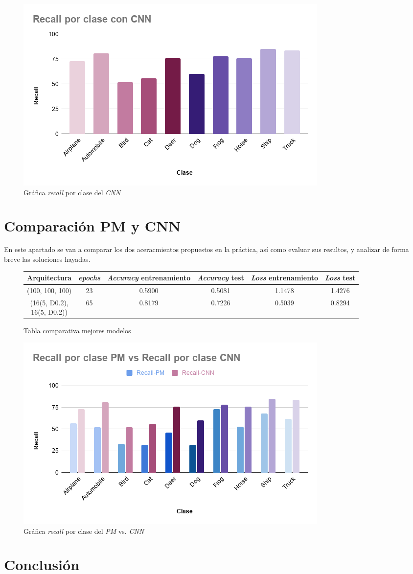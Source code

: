 \documentclass{uc3mpracticas}
\begin{document}
\begin{figure}[!h]
\centering
  \includegraphics[width=.65\linewidth]{Images/recall_clase_CNN.png}
  \caption*{Gráfica \textit{recall} por clase del \textit{CNN}}
\end{figure}




\section{Comparación PM y CNN}

En este apartado se van a comparar los dos aceracmientos propuestos en la práctica, así como evaluar sus resultos, y analizar de forma breve las soluciones hayadas.


\begin{figure}[!h]
\begin{center}
  \begin{tabular}{|c|c|c|c|c|c|}
    \hline
    \rowcolor{Gray}
        \textbf{Arquitectura} & \textbf{\textit{epochs}}& \textbf{\textit{Accuracy} entrenamiento} & \textbf{\textit{Accuracy} test} & \textbf{\textit{Loss} entrenamiento} & \textbf{\textit{Loss} test}\\ \hline \hline
        (100, 100, 100)       & 23                      &  0.5900                                  &  0.5081                         &  1.1478                              &  1.4276            \\ \hline \hline
        \makecell{(16(5, D0.2), \\ 16(5, D0.2))}& 65   &  0.8179                                  &  0.7226                         &  0.5039                              &  0.8294            \\ \hline
  \end{tabular}
\end{center}
\caption*{Tabla comparativa mejores modelos}
\end{figure}

\begin{figure}[!h]
\centering
  \includegraphics[width=.7\linewidth]{Images/recall_clase_PM_CNN.png}
  \caption*{Gráfica \textit{recall} por clase del \textit{PM} vs. \textit{CNN}}
\end{figure}

\section{Conclusión}
\end{document}
